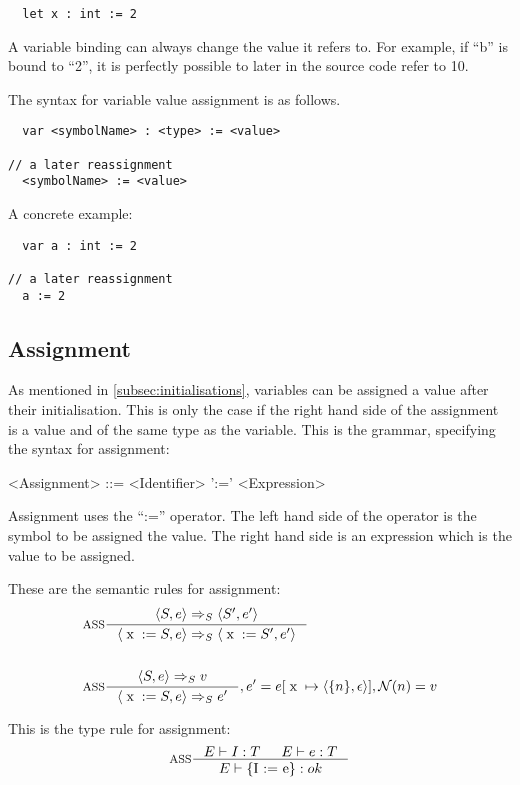 \begin{verbatim}
  let x : int := 2
\end{verbatim}

A variable binding can always change the value it refers to. For example, if \enquote{b} is bound to \enquote{2}, it is perfectly possible to later in the source code refer to {10}.

The syntax for variable value assignment is as follows.

\begin{verbatim}
  var <symbolName> : <type> := <value>

// a later reassignment
  <symbolName> := <value>
\end{verbatim}
A concrete example:

\begin{verbatim}
  var a : int := 2
  
// a later reassignment
  a := 2
\end{verbatim}

\subsection{Assignment}\label{subsec:assignment}
As mentioned in \cref{subsec:initialisations}, variables can be assigned a value after their initialisation. This is only the case if the right hand side of the assignment is a value and of the same type as the variable.
This is the grammar, specifying the syntax for assignment:
\begin{grammar}
<Assignment> ::= <Identifier>  ':=' <Expression>
\end{grammar}
Assignment uses the \enquote{:=} operator. The left hand side of the operator is the symbol to be assigned the value. The right hand side is an expression which is the value to be assigned.

These are the semantic rules for assignment:
\begin{align*}
&\inference[ASS]{\Braket{S,e} \Rightarrow_S \Braket{S',e'}}
                 {\Braket{\Tx := S,e} \Rightarrow_S \Braket{\Tx := S',e'}}
\\\\
&\inference[ASS]{\Braket{S,e} \Rightarrow_S v}
                 {\Braket{\Tx := S,e} \Rightarrow_S e'}
								 {, e' = e[\Tx \mapsto \Braket{\{n\},\epsilon}], \mathcal{N}(n) = v}
\end{align*}

This is the type rule for assignment:
\begin{align*}
&\inference[ASS]{\Tenv I : T & \Tenv e: T}
                 {\Tenv \text{\{I := e\}} : ok}
\\\\
\end{align*}
